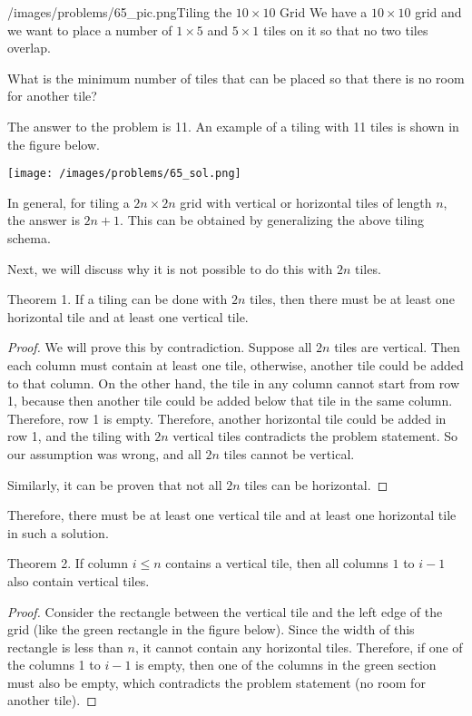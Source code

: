 \begin{problem}{/images/problems/65_pic.png}{Tiling the $10 \times 10$ Grid} We have a  $10 \times 10$ grid and we want to place a number of $1 \times 5$ and $5 \times 1$ tiles on it so that no two tiles overlap.
	
	What is the minimum number of tiles that can be placed so that there is no room for another tile?
\end{problem}
\begin{solution}
The answer to the problem is 11. An example of a tiling with 11 tiles is shown in the figure below.

\begin{center}
	\texttt{[image: /images/problems/65\_sol.png]}
\end{center}

In general, for tiling a $2n  \times  2n$ grid with vertical or horizontal tiles of length $n$, the answer is $2n + 1$. This can be obtained by generalizing the above tiling schema.

Next, we will discuss why it is not possible to do this with $2n$ tiles. 

\begin{theorem} Theorem 1. If a tiling can be done with $2n$ tiles, then there must be at least one horizontal tile and at least one vertical tile.
\end{theorem}

\begin{proof}We will prove this by contradiction. Suppose all $2n$ tiles are vertical. Then each column must contain at least one tile, otherwise, another tile could be added to that column. On the other hand, the tile in any column cannot start from row 1, because then another tile could be added below that tile in the same column. Therefore, row 1 is empty. Therefore, another horizontal tile could be added in row 1, and the tiling with $2n$ vertical tiles contradicts the problem statement. So our assumption was wrong, and all $2n$ tiles cannot be vertical.

Similarly, it can be proven that not all $2n$ tiles can be horizontal.
\end{proof}

Therefore, there must be at least one vertical tile and at least one horizontal tile in such a solution.

\begin{theorem} Theorem 2. If column $i  \leq n$ contains a vertical tile, then all columns $1$ to $i-1$ also contain vertical tiles.
\end{theorem}
\begin{proof}
	Consider the rectangle between the vertical tile and the left edge of the grid (like the green rectangle in the figure below). Since the width of this rectangle is less than $n$, it cannot contain any horizontal tiles. Therefore, if one of the columns 1 to $i-1$ is empty, then one of the columns in the green section must also be empty, which contradicts the problem statement (no room for another tile).
	

\end{proof}
\end{solution}
